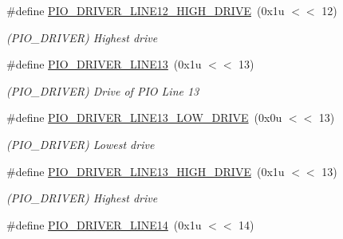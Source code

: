 \begin{DoxyCompactItemize}
\mbox{\label{group__SAME70__PIO_ga60c0f0f249e990701e8e27247ebe8a0c}} 
\#define \mbox{\hyperlink{group__SAME70__PIO_ga60c0f0f249e990701e8e27247ebe8a0c}{P\+I\+O\+\_\+\+D\+R\+I\+V\+E\+R\+\_\+\+L\+I\+N\+E12\+\_\+\+H\+I\+G\+H\+\_\+\+D\+R\+I\+VE}}~(0x1u $<$$<$ 12)
\begin{DoxyCompactList}\small\item\em (P\+I\+O\+\_\+\+D\+R\+I\+V\+ER) Highest drive \end{DoxyCompactList}\item 
\mbox{\label{group__SAME70__PIO_gaf97161f3fc0eb7b7a90271c9d85c25ad}} 
\#define \mbox{\hyperlink{group__SAME70__PIO_gaf97161f3fc0eb7b7a90271c9d85c25ad}{P\+I\+O\+\_\+\+D\+R\+I\+V\+E\+R\+\_\+\+L\+I\+N\+E13}}~(0x1u $<$$<$ 13)
\begin{DoxyCompactList}\small\item\em (P\+I\+O\+\_\+\+D\+R\+I\+V\+ER) Drive of P\+IO Line 13 \end{DoxyCompactList}\item 
\mbox{\label{group__SAME70__PIO_ga6c7d75cdc8fc502ca1591322df59ee65}} 
\#define \mbox{\hyperlink{group__SAME70__PIO_ga6c7d75cdc8fc502ca1591322df59ee65}{P\+I\+O\+\_\+\+D\+R\+I\+V\+E\+R\+\_\+\+L\+I\+N\+E13\+\_\+\+L\+O\+W\+\_\+\+D\+R\+I\+VE}}~(0x0u $<$$<$ 13)
\begin{DoxyCompactList}\small\item\em (P\+I\+O\+\_\+\+D\+R\+I\+V\+ER) Lowest drive \end{DoxyCompactList}\item 
\mbox{\label{group__SAME70__PIO_ga35cfa7a75637d43bd35b6583801bacac}} 
\#define \mbox{\hyperlink{group__SAME70__PIO_ga35cfa7a75637d43bd35b6583801bacac}{P\+I\+O\+\_\+\+D\+R\+I\+V\+E\+R\+\_\+\+L\+I\+N\+E13\+\_\+\+H\+I\+G\+H\+\_\+\+D\+R\+I\+VE}}~(0x1u $<$$<$ 13)
\begin{DoxyCompactList}\small\item\em (P\+I\+O\+\_\+\+D\+R\+I\+V\+ER) Highest drive \end{DoxyCompactList}\item 
\mbox{\label{group__SAME70__PIO_ga397e14fa6b7191bd73435f296c3227b8}} 
\#define \mbox{\hyperlink{group__SAME70__PIO_ga397e14fa6b7191bd73435f296c3227b8}{P\+I\+O\+\_\+\+D\+R\+I\+V\+E\+R\+\_\+\+L\+I\+N\+E14}}~(0x1u $<$$<$ 14)
$$
\end{DoxyCompactItemize}

